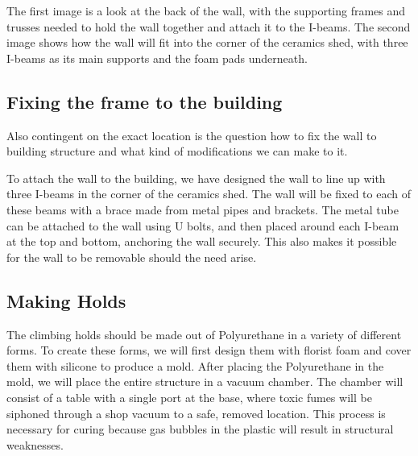 \documentclass{scrartcl}
\begin{document}
\begin{figure}[h]
\end{figure}

The first image is a look at the back of the wall, with the supporting frames and trusses needed to hold the wall together and attach it to the I-beams. The second image shows how the wall will fit into the corner of the ceramics shed, with three I-beams as its main supports and the foam pads underneath.

\subsection{Fixing the frame to the building}
Also contingent on the exact location is the question how to fix the wall to building structure and what kind of modifications we can make to it.

To attach the wall to the building, we have designed the wall to line up with three I-beams in the corner of the ceramics shed. The wall will be fixed to each of these beams with a brace made from metal pipes and brackets. The metal tube can be attached to the wall using U bolts, and then placed around each I-beam at the top and bottom, anchoring the wall securely. This also makes it possible for the wall to be removable should the need arise.

\subsection{Making Holds}
The climbing holds should be made out of Polyurethane in a variety of different forms. To create these forms, we will first design them with florist foam and cover them with silicone to produce a mold. After placing the Polyurethane in the mold, we will place the entire structure in a vacuum chamber. The chamber will consist of a table with a single port at the base, where toxic fumes will be siphoned through a shop vacuum to a safe, removed location. This process is necessary for curing because gas bubbles in the plastic will result in structural weaknesses. 
\end{document}
